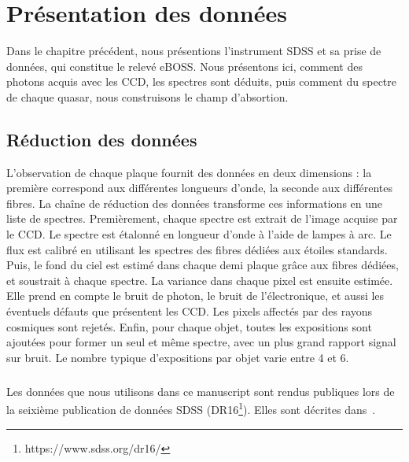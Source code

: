 \documentclass[11pt, twoside, a4paper, openright]{report}
\begin{document}

\graphicspath{ {../figures/donnees/} }

\chapter{Présentation des données}
\minitoc
\newpage
\thispagestyle{fancy}

Dans le chapitre précédent, nous présentions l'instrument SDSS et sa prise de données, qui constitue le relevé eBOSS. Nous présentons ici, comment des photons acquis avec les CCD, les spectres sont déduits, puis comment du spectre de chaque quasar, nous construisons le champ d'absortion.

\section{Réduction des données}
L'observation de chaque plaque fournit des données en deux dimensions : la première correspond aux différentes longueurs d'onde, la seconde aux différentes fibres. La chaîne de réduction des données transforme ces informations en une liste de spectres.
Premièrement, chaque spectre est extrait de l'image acquise par le CCD. Le spectre est étalonné en longueur d'onde à l'aide de lampes à arc. Le flux est calibré en utilisant les spectres des fibres dédiées aux étoiles standards. Puis, le fond du ciel est estimé dans chaque demi plaque grâce aux fibres dédiées, et soustrait à chaque spectre.
La variance dans chaque pixel est ensuite estimée. Elle prend en compte le bruit de photon, le bruit de l'électronique, et aussi les éventuels défauts que présentent les CCD. Les pixels affectés par des rayons cosmiques sont rejetés.
Enfin, pour chaque objet, toutes les expositions sont ajoutées pour former un seul et même spectre, avec un plus grand rapport signal sur bruit. Le nombre typique d'expositions par objet varie entre 4 et 6.

\paragraph{}
Les données que nous utilisons dans ce manuscript sont rendus publiques lors de la seixième publication de données SDSS (DR16\footnote{https://www.sdss.org/dr16/}). Elles sont décrites dans~\cite{Ahumada2019}.
\end{document}
